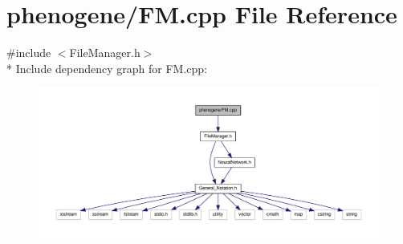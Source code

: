 \hypertarget{a00005}{\section{phenogene/\-F\-M.cpp File Reference}
\label{dd/dad/a00005}
}
{\ttfamily \#include $<$File\-Manager.\-h$>$}\\*
Include dependency graph for F\-M.\-cpp\-:
\nopagebreak
\begin{figure}[H]
\begin{center}
\leavevmode
\includegraphics[width=350pt]{d3/d52/a00023}
\end{center}
\end{figure}

